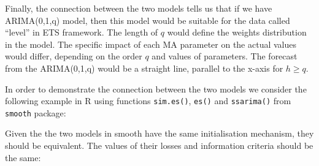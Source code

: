 \documentclass[
]{book}
\newenvironment{Shaded}{\begin{snugshade}}{\end{snugshade}}
\newcommand{\AttributeTok}[1]{\textcolor[rgb]{0.77,0.63,0.00}{#1}}
\newcommand{\CommentTok}[1]{\textcolor[rgb]{0.56,0.35,0.01}{\textit{#1}}}
\newcommand{\DecValTok}[1]{\textcolor[rgb]{0.00,0.00,0.81}{#1}}
\newcommand{\FloatTok}[1]{\textcolor[rgb]{0.00,0.00,0.81}{#1}}
\newcommand{\FunctionTok}[1]{\textcolor[rgb]{0.00,0.00,0.00}{#1}}
\newcommand{\NormalTok}[1]{#1}
\newcommand{\OtherTok}[1]{\textcolor[rgb]{0.56,0.35,0.01}{#1}}
\newcommand{\SpecialCharTok}[1]{\textcolor[rgb]{0.00,0.00,0.00}{#1}}
\newcommand{\StringTok}[1]{\textcolor[rgb]{0.31,0.60,0.02}{#1}}
\theoremstyle{definition}
\theoremstyle{definition}
\theoremstyle{definition}
\theoremstyle{definition}
\theoremstyle{remark}
\begin{document}
Finally, the connection between the two models tells us that if we have ARIMA(0,1,q) model, then this model would be suitable for the data called ``level'' in ETS framework. The length of \(q\) would define the weights distribution in the model. The specific impact of each MA parameter on the actual values would differ, depending on the order \(q\) and values of parameters. The forecast from the ARIMA(0,1,q) would be a straight line, parallel to the x-axis for \(h\geq q\).

In order to demonstrate the connection between the two models we consider the following example in R using functions \texttt{sim.es()}, \texttt{es()} and \texttt{ssarima()} from \texttt{smooth} package:

\begin{Shaded}
\end{Shaded}

Given the the two models in smooth have the same initialisation mechanism, they should be equivalent. The values of their losses and information criteria should be the same:

\begin{Shaded}
\end{Shaded}
\end{document}
